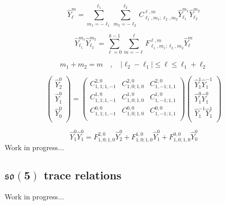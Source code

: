 %
%
\begin{equation}
\hat{Y}^{m}_{\ell}
=
\sum_{m_1=-\ell_1}^{\ell_1}
\sum_{m_2=-\ell_2}^{\ell_2}
C^{\ell,m}_{\ell_1,m_1;\ell_2,m_2}
\hat{Y}^{m_1}_{\ell_1} \hat{Y}^{m_2}_{\ell_2}
\end{equation}
%
%

%
%
\begin{equation}
\hat{Y}^{m_1}_{\ell_1} \hat{Y}^{m_2}_{\ell_2}
=
\sum_{\ell=0}^{k-1}
\sum_{m=-\ell}^{\ell}
F^{\ell,m}_{\ell_1,m_1;\ell_2,m_2}
\hat{Y}^{m}_{\ell}
\end{equation}
%
%

%
%
\begin{equation}
m_1 + m_2 = m
%
\quad , \quad
%
|\ell_2 - \ell_1| \leq \ell \leq \ell_1 + \ell_2
\end{equation}
%
%

%
%
\begin{equation}
\left( \begin{array}{c}
\hat{Y}^{0}_{2} \\
\hat{Y}^{0}_{1} \\
\hat{Y}^{0}_{0} \\
\end{array}\right)
=
\left( \begin{array}{ccc}
C^{2,0}_{1,1;1,-1} & C^{2,0}_{1,0;1,0} & C^{2,0}_{1,-1;1,1} \\
C^{1,0}_{1,1;1,-1} & C^{1,0}_{1,0;1,0} & C^{1,0}_{1,-1;1,1} \\
C^{0,0}_{1,1;1,-1} & C^{0,0}_{1,0;1,0} & C^{0,0}_{1,-1;1,1} \\
\end{array}\right)
\left( \begin{array}{c}
\hat{Y}^{1}_{1} \hat{Y}^{-1}_{1} \\
\hat{Y}^{0}_{1} \hat{Y}^{0}_{1} \\
\hat{Y}^{-1}_{1} \hat{Y}^{1}_{1} \\
\end{array}\right)
\end{equation}
%
%

%
%
\begin{equation}
\hat{Y}^{0}_{1} \hat{Y}^{0}_{1}
=
F^{2,0}_{1,0;1,0} \hat{Y}^{0}_{2}
+
F^{1,0}_{1,0;1,0} \hat{Y}^{0}_{1}
+
F^{0,0}_{1,0;1,0} \hat{Y}^{0}_{0}
\end{equation}
%
%
Work in progress...

\subsection[$\mathfrak{so}(5)$ trace relations]{$\mathbf{\mathfrak{so}(5)}$ trace relations}
Work in progress...

